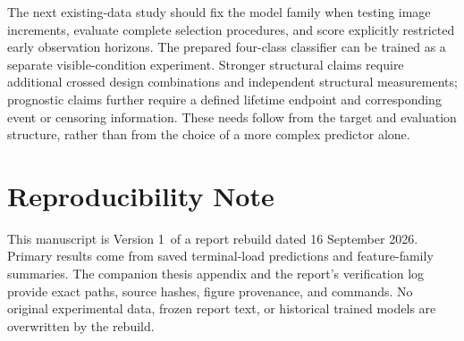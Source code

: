\documentclass[conference]{IEEEtran}
\newcommand{\shared}{..}
\newcommand{\draftversion}{Version 1}
\begin{document}
The next existing-data study should fix the model family when testing image increments, evaluate complete selection procedures, and score explicitly restricted early observation horizons. The prepared four-class classifier can be trained as a separate visible-condition experiment. Stronger structural claims require additional crossed design combinations and independent structural measurements; prognostic claims further require a defined lifetime endpoint and corresponding event or censoring information. These needs follow from the target and evaluation structure, rather than from the choice of a more complex predictor alone.

\section*{Reproducibility Note}
This manuscript is \draftversion\ of a report rebuild dated 16 September 2026. Primary results come from saved terminal-load predictions and feature-family summaries. The companion thesis appendix and the report's verification log provide exact paths, source hashes, figure provenance, and commands. No original experimental data, frozen report text, or historical trained models are overwritten by the rebuild.



\end{document}

